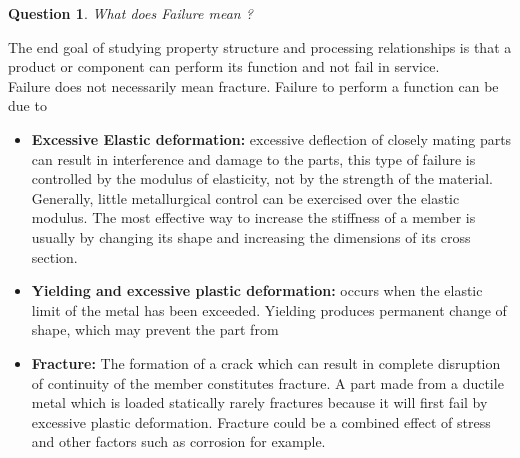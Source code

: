\documentclass[13]{article}
\newtheorem{exer}{Question}
\begin{document}
\begin{exer}
What does Failure mean ?
\end{exer}
The end goal of studying property structure and processing relationships is that a product or component can perform its function and not fail in service. \\ Failure does not necessarily mean fracture. Failure to perform a function can be due to
\begin{itemize}

	\item \textbf{Excessive Elastic deformation:}  excessive deflection of closely mating
	parts can result  in interference and damage to the parts, this type
	of failure is controlled by the modulus of elasticity, not by the
	strength of the material. Generally, little metallurgical control can
	be exercised over the  elastic modulus. The most effective way to
	increase the stiffness  of a member is usually by changing its shape
	and increasing the dimensions of its cross section.
\item \textbf{Yielding and excessive plastic deformation:}  occurs when the elastic
	limit of the metal has been  exceeded. Yielding produces permanent
	change of shape, which may prevent the part from 
\item \textbf{Fracture:}  The formation of a crack which can result in complete
	disruption of continuity of the member  constitutes fracture. A part
	made from a ductile metal which is loaded statically rarely
	fractures because it will first fail by excessive plastic
	deformation.  Fracture could be a combined effect of stress and other
	factors such as corrosion for example.


\end{itemize}
\end{document}
